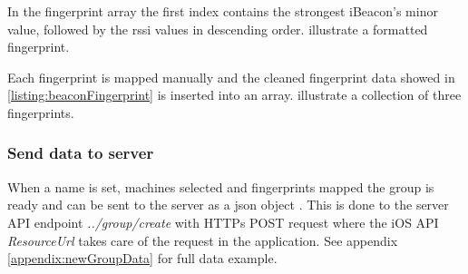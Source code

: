 \bigskip

In the fingerprint array the first index contains the strongest iBeacon's minor value, followed by the \acrshort{rssi} values in descending order.
 illustrate a formatted fingerprint.



Each fingerprint is mapped manually and the cleaned fingerprint data showed in \cref{listing:beaconFingerprint} is inserted into an array.
 illustrate a collection of three fingerprints.


\subsubsection{Send data to server}\label{sec:implAppnewGroupSend}
When a name is set, machines selected and fingerprints mapped the group is ready and can be sent to the server as a \acrfull{json} object \cite{IntroducingJSON}.
This is done to the server API endpoint \textit{../group/create} with HTTPs POST request \cite{POSTHTTPMDN} where the iOS API \textit{ResourceUrl} \cite{ResourceURLAppleDeveloper} takes care of the request in the application.
See appendix \ref{appendix:newGroupData} for full data example.
